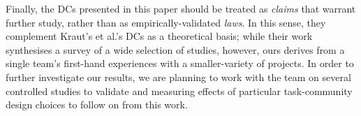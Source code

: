 \documentclass{sigchi}
\begin{document}
\begin{spacing}{0.97}
Finally, the DCs presented in this paper should be treated as \emph{claims} that warrant further study, rather than as empirically-validated \emph{laws}. In this sense, they complement Kraut's et al.'s DCs as a theoretical basis; while their work synthesises a survey of a wide selection of studies, however, ours derives from a single team's first-hand experiences with a smaller-variety of projects. In order to further investigate our results, we are planning to work with the team on several controlled studies to validate and measuring effects of particular task-community design choices to follow on from this work.







\end{spacing}
\end{document}
